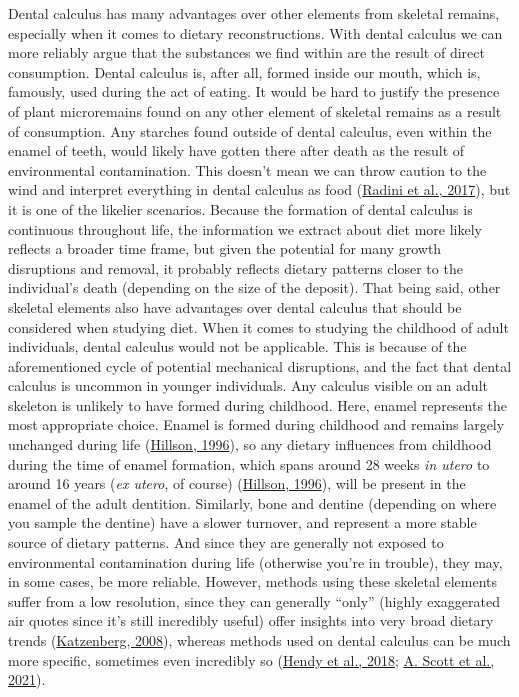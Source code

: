 \documentclass[
  letterpaper,
]{book}
\begin{document}
Dental calculus has many advantages over other elements from skeletal
remains, especially when it comes to dietary reconstructions. With
dental calculus we can more reliably argue that the substances we find
within are the result of direct consumption. Dental calculus is, after
all, formed inside our mouth, which is, famously, used during the act of
eating. It would be hard to justify the presence of plant microremains
found on any other element of skeletal remains as a result of
consumption. Any starches found outside of dental calculus, even within
the enamel of teeth, would likely have gotten there after death as the
result of environmental contamination. This doesn't mean we can throw
caution to the wind and interpret everything in dental calculus as food
(\protect\hyperlink{ref-radiniFoodPathways2017}{Radini et al., 2017}),
but it is one of the likelier scenarios. Because the formation of dental
calculus is continuous throughout life, the information we extract about
diet more likely reflects a broader time frame, but given the potential
for many growth disruptions and removal, it probably reflects dietary
patterns closer to the individual's death (depending on the size of the
deposit). That being said, other skeletal elements also have advantages
over dental calculus that should be considered when studying diet. When
it comes to studying the childhood of adult individuals, dental calculus
would not be applicable. This is because of the aforementioned cycle of
potential mechanical disruptions, and the fact that dental calculus is
uncommon in younger individuals. Any calculus visible on an adult
skeleton is unlikely to have formed during childhood. Here, enamel
represents the most appropriate choice. Enamel is formed during
childhood and remains largely unchanged during life
(\protect\hyperlink{ref-hillsonDentalAnthropology1996}{Hillson, 1996}),
so any dietary influences from childhood during the time of enamel
formation, which spans around 28 weeks \emph{in utero} to around 16
years (\emph{ex utero}, of course)
(\protect\hyperlink{ref-hillsonDentalAnthropology1996}{Hillson, 1996}),
will be present in the enamel of the adult dentition. Similarly, bone
and dentine (depending on where you sample the dentine) have a slower
turnover, and represent a more stable source of dietary patterns. And
since they are generally not exposed to environmental contamination
during life (otherwise you're in trouble), they may, in some cases, be
more reliable. However, methods using these skeletal elements suffer
from a low resolution, since they can generally ``only'' (highly
exaggerated air quotes since it's still incredibly useful) offer
insights into very broad dietary trends
(\protect\hyperlink{ref-katzenbergStableIsotope2008}{Katzenberg, 2008}),
whereas methods used on dental calculus can be much more specific,
sometimes even incredibly so
(\protect\hyperlink{ref-hendyProteomicCalculus2018}{Hendy et al., 2018};
\protect\hyperlink{ref-scottExoticFoods2021}{A. Scott et al., 2021}).
\end{document}
